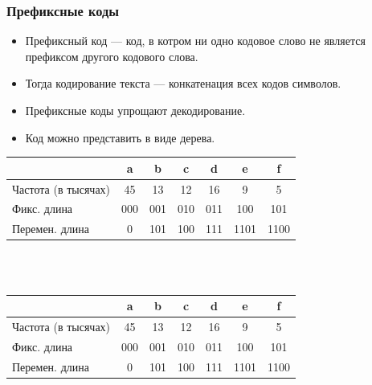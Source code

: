 \documentclass[hyperref={unicode=true}]{beamer}
\begin{document}
\begin{frame}
\frametitle{Префиксные коды}
\begin{itemize}
\item Префиксный код --- код, в котром ни одно кодовое слово не является
префиксом другого кодового слова. 
\item Тогда кодирование текста --- конкатенация всех кодов символов. 
\item Префиксные коды упрощают декодирование. 
\item Код можно представить в виде дерева. 
\end{itemize}
\end{frame}

\begin{frame}
\begin{tabular}{l|cccccc}
 & a & b & c & d & e & f \\
\hline
Частота (в тысячах) & 45 & 13 & 12 & 16 & 9 & 5 \\
Фикс. длина & 000 & 001 & 010 & 011 & 100 & 101 \\
Перемен. длина & 0 & 101& 100 & 111 & 1101 & 1100
\end{tabular} \\
~\\

\end{frame}

\begin{frame}[plain]
\begin{tabular}{l|cccccc}
 & a & b & c & d & e & f \\
\hline
Частота (в тысячах) & 45 & 13 & 12 & 16 & 9 & 5 \\
Фикс. длина & 000 & 001 & 010 & 011 & 100 & 101 \\
Перемен. длина & 0 & 101& 100 & 111 & 1101 & 1100
\end{tabular} \\
~\\
~\\
\begin{center}
\end{center}

\end{frame}
\end{document}
